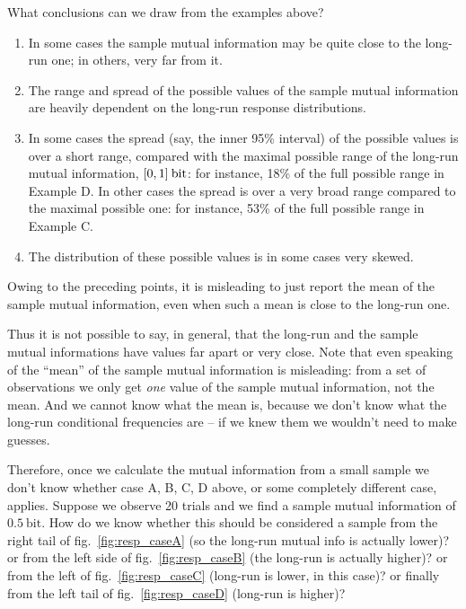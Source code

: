 \documentclass[\ifafour a4paper,12pt,\else a5paper,10pt,\fi%
onecolumn,oneside,article,%
british%
]{memoir}
\theoremstyle{remark}
\theoremstyle{innote}
\DeclarePairedDelimiter\clcl{[}{]}
\renewcommand*{\|}[1][]{\nonscript\,#1\vert\nonscript\;\mathopen{}}
\newcommand*{\fig}{fig.}%
\newcommand*{\bit}{\mathrm{bit}}
\begin{document}
\clearpage



What conclusions can we draw from the examples above?
\begin{enumerate}[wide,label=(\roman*)]
\item In some cases the sample mutual information may be quite close to the
  long-run one; in others, very far from it.
\item The range and spread of the possible values of the sample mutual
  information are heavily dependent on the long-run response distributions.
\item In some cases the spread (say, the inner 95\% interval) of the
  possible values is over a short range, compared with the maximal possible
  range of the long-run mutual information, $\clcl{0, 1}\:\bit$: for
  instance, 18\% of the full possible range in Example D. In other cases
  the spread is over a very broad range compared to the maximal possible
  one: for instance, 53\% of the full possible range in Example C.
\item The distribution of these possible values is in some cases very
  skewed.
\end{enumerate}

Owing to the preceding points, it is misleading to just report the mean of
the sample mutual information, even when such a mean is close to the
long-run one.

Thus it is not possible to say, in general, that the long-run and the
sample mutual informations have values far apart or very close. Note that even
speaking of the \enquote{mean} of the sample mutual information is
misleading: from a set of observations we only get \emph{one} value of the
sample mutual information, not the mean. And we cannot know what the mean
is, because we don't know what the long-run conditional frequencies are --
if we knew them we wouldn't need to make guesses.

Therefore, once we calculate the mutual information from a small sample we
don't know whether case A, B, C, D above, or some completely different
case, applies. Suppose we observe 20 trials and we find a sample mutual
information of $0.5\:\bit$. How do we know whether this should be
considered a sample from the right tail of \fig~\ref{fig:resp_caseA} (so
the long-run mutual info is actually lower)? or from the left side of
\fig~\ref{fig:resp_caseB} (the long-run is actually higher)? or from the
left of \fig~\ref{fig:resp_caseC} (long-run is lower, in this case)? or
finally from the left tail of \fig~\ref{fig:resp_caseD} (long-run is
higher)?
\end{document}
